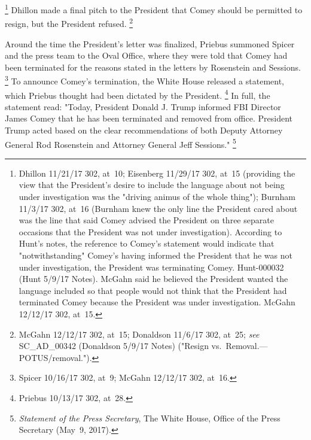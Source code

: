 \footnote{Dhillon 11/21/17 302, at~10;
Eisenberg 11/29/17 302, at~15 (providing the view that the President's desire to include the language about not being under investigation was the "driving animus of the whole thing");
Burnham 11/3/17 302, at~16 (Burnham knew the only line the President cared about was the line that said Comey advised the President on three separate occasions that the President was not under investigation).
According to Hunt's notes, the reference to Comey's statement would indicate that "notwithstanding" Comey's having informed the President that he was not under investigation, the President was terminating Comey.
Hunt-000032 (Hunt 5/9/17 Notes).
McGahn said he believed the President wanted the language included so that people would not think that the President had terminated Comey because the President was under investigation.
McGahn 12/12/17 302, at~15.}
Dhillon made a final pitch to the President that Comey should be permitted to resign, but the President refused.%
\footnote{McGahn 12/12/17 302, at~15;
Donaldson 11/6/17 302, at~25;
\textit{see} SC\_AD\_00342 (Donaldson 5/9/17 Notes) ("Resign vs.\ Removal.---POTUS/removal.").}

Around the time the President's letter was finalized, Priebus summoned Spicer and the press team to the Oval Office, where they were told that Comey had been terminated for the reasons stated in the letters by Rosenstein and Sessions.%
\footnote{Spicer 10/16/17 302, at~9;
McGahn 12/12/17 302, at~16.}
To announce Comey's termination, the White House released a statement, which Priebus thought had been dictated by the President.%
\footnote{Priebus 10/13/17 302, at~28.}
In full, the statement read: "Today, President Donald J. Trump informed FBI Director James Comey that he has been terminated and removed from office.
President Trump acted based on the clear recommendations of both Deputy Attorney General Rod Rosenstein and Attorney General Jeff Sessions."%
\footnote{\textit{Statement of the Press Secretary}, The White House, Office of the Press Secretary (May~9, 2017).}

